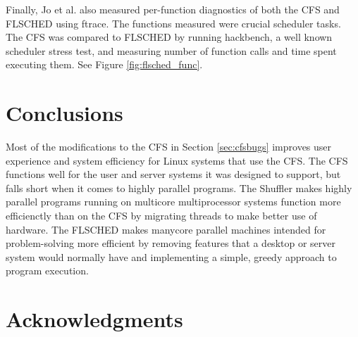 \documentclass{sig-alternate}
\begin{document}
Finally, Jo et al. also measured per-function diagnostics of both the CFS and FLSCHED using ftrace. The functions measured were crucial scheduler tasks. The CFS was compared to FLSCHED by running hackbench, a well known scheduler stress test, and measuring number of function calls and time spent executing them. See Figure \ref{fig:flsched_func}.\cite{Jo:2017}

\begin{figure*}
\centering
{}
\caption{Average time and function call counts for critical scheduler tasks. The numbers were gathered using ftrace while running the hackbench stress test for thread schedulers. From Jo et al.~\cite{Jo:2017}}
\label{fig:flsched_func}
\end{figure*}

\section{Conclusions}
\label{sec:conclusions}

Most of the modifications to the CFS in Section \ref{sec:cfsbugs} improves user experience and system efficiency for Linux systems that use the CFS. The CFS functions well for the user and server systems it was designed to support, but falls short when it comes to highly parallel programs. The Shuffler makes highly parallel programs running on multicore multiprocessor systems function more efficienctly than on the CFS by migrating threads to make better use of hardware. The FLSCHED makes manycore parallel machines intended for problem-solving more efficient by removing features that a desktop or server system would normally have and implementing a simple, greedy approach to program execution.

\section*{Acknowledgments}
\label{sec:acknowledgments}


  
\end{document}
